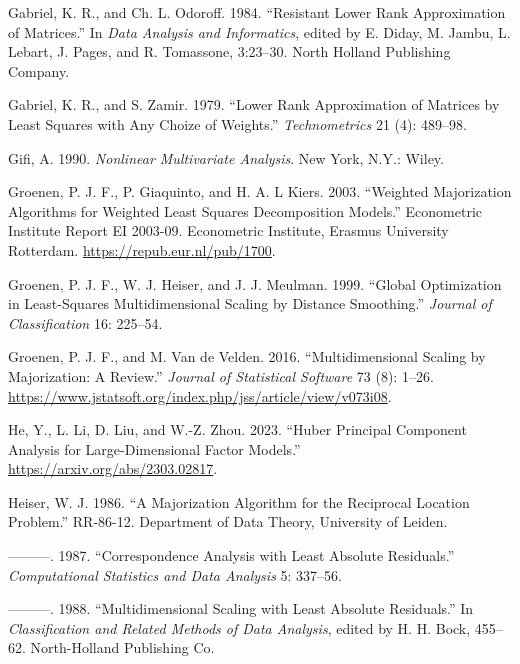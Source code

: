 \documentclass[
  12pt,
  letterpaper,
  DIV=11,
  numbers=noendperiod]{scrartcl}
\newlength{\cslhangindent}
\newenvironment{CSLReferences}[2] %
 {\begin{list}{}{%
  \setlength{\itemindent}{0pt}
  \setlength{\leftmargin}{0pt}
  \setlength{\parsep}{0pt}
  \ifodd #1
   \setlength{\leftmargin}{\cslhangindent}
   \setlength{\itemindent}{-1\cslhangindent}
  \fi
  \setlength{\itemsep}{#2\baselineskip}}}
 {\end{list}}
\theoremstyle{definition}
\theoremstyle{plain}
\theoremstyle{plain}
\theoremstyle{remark}
\begin{document}
\begin{CSLReferences}{1}{0}
Gabriel, K. R., and Ch. L. Odoroff. 1984. {``Resistant Lower Rank
Approximation of Matrices.''} In \emph{Data Analysis and Informatics},
edited by E. Diday, M. Jambu, L. Lebart, J. Pages, and R. Tomassone,
3:23--30. North Holland Publishing Company.

Gabriel, K. R., and S. Zamir. 1979. {``{Lower Rank Approximation of
Matrices by Least Squares with Any Choize of Weights}.''}
\emph{Technometrics} 21 (4): 489--98.

Gifi, A. 1990. \emph{Nonlinear Multivariate Analysis}. New York, N.Y.:
Wiley.

Groenen, P. J. F., P. Giaquinto, and H. A. L Kiers. 2003. {``{Weighted
Majorization Algorithms for Weighted Least Squares Decomposition
Models}.''} Econometric Institute Report EI 2003-09. Econometric
Institute, Erasmus University Rotterdam.
\url{https://repub.eur.nl/pub/1700}.

Groenen, P. J. F., W. J. Heiser, and J. J. Meulman. 1999. {``{Global
Optimization in Least-Squares Multidimensional Scaling by Distance
Smoothing}.''} \emph{Journal of Classification} 16: 225--54.

Groenen, P. J. F., and M. Van de Velden. 2016. {``{Multidimensional
Scaling by Majorization: A Review}.''} \emph{Journal of Statistical
Software} 73 (8): 1--26.
\url{https://www.jstatsoft.org/index.php/jss/article/view/v073i08}.

He, Y., L. Li, D. Liu, and W.-Z. Zhou. 2023. {``Huber Principal
Component Analysis for Large-Dimensional Factor Models.''}
\url{https://arxiv.org/abs/2303.02817}.

Heiser, W. J. 1986. {``{A Majorization Algorithm for the Reciprocal
Location Problem}.''} RR-86-12. Department of Data Theory, University of
Leiden.

---------. 1987. {``{Correspondence Analysis with Least Absolute
Residuals}.''} \emph{Computational Statistics and Data Analysis} 5:
337--56.

---------. 1988. {``{Multidimensional Scaling with Least Absolute
Residuals}.''} In \emph{Classification and Related Methods of Data
Analysis}, edited by H. H. Bock, 455--62. North-Holland Publishing Co.


\end{CSLReferences}
\end{document}

